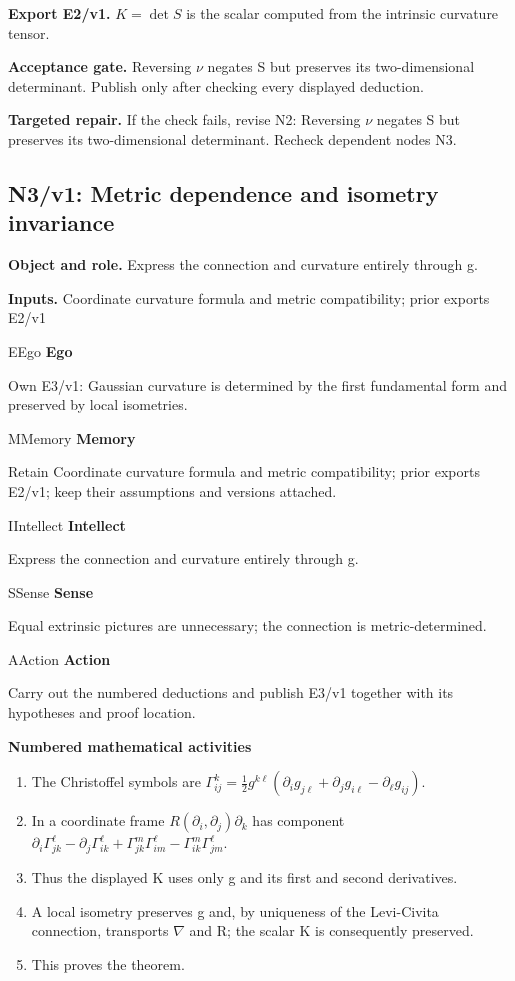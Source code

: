 \documentclass[preprint,12pt,aps,pra,showkeys,amsmath,amssymb,superscriptaddress,floatfix]{revtex4-2}
\theoremstyle{definition}
\theoremstyle{remark}
\newcommand{\mmfaculty}[3]{%
 \begin{mmfacultybox}{#1}{#2}
 {\sffamily\bfseries\color{MMBlue}#2}\par\smallskip #3
 \end{mmfacultybox}}
\newcommand{\field}[2]{\par\smallskip\noindent\textbf{#1.} #2\par}
\begin{document}
\field{Export E2/v1}{\(K=\operatorname{det} S\) is the scalar computed from the intrinsic
curvature tensor.}

\field{Acceptance gate}{Reversing \(\nu\) negates S but preserves its two-dimensional
determinant. Publish only after checking every displayed deduction.}

\field{Targeted repair}{If the check fails, revise N2: Reversing \(\nu\) negates S but preserves
its two-dimensional determinant. Recheck dependent nodes N3.}

\clearpage

\subsection{N3/v1: Metric dependence and isometry invariance}

\field{Object and role}{Express the connection and curvature entirely through g.}

\field{Inputs}{Coordinate curvature formula and metric compatibility; prior exports
E2/v1}

\mmfaculty{E}{Ego}{Own E3/v1: Gaussian curvature is determined by the first fundamental
form and preserved by local isometries.}

\mmfaculty{M}{Memory}{Retain Coordinate curvature formula and metric compatibility; prior
exports E2/v1; keep their assumptions and versions attached.}

\mmfaculty{I}{Intellect}{Express the connection and curvature entirely through g.}

\mmfaculty{S}{Sense}{Equal extrinsic pictures are unnecessary; the connection is
metric-determined.}

\mmfaculty{A}{Action}{Carry out the numbered deductions and publish E3/v1 together with its
hypotheses and proof location.}

\smallskip\noindent\textbf{Numbered mathematical activities}

\begin{enumerate}[label=N3.\arabic*,leftmargin=3.4em]

\item The Christoffel symbols are
\(\Gamma^k_{ij}=\tfrac12 g^{k\ell}(\partial_i g_{j\ell}+\partial_j g_{i\ell}-\partial_\ell g_{ij})\).

\item In a coordinate frame \(R(\partial _i,\partial _j)\partial _k\) has
component
\(\partial_i\Gamma^\ell_{jk}-\partial_j\Gamma^\ell_{ik}+\Gamma^m_{jk}\Gamma^\ell_{im}-\Gamma^m_{ik}\Gamma^\ell_{jm}\).

\item Thus the displayed K uses only g and its first and second derivatives.

\item A local isometry preserves g and, by uniqueness of the Levi-Civita
connection, transports \(\nabla\) and R; the scalar K is consequently
preserved.

\item This proves the theorem.

\end{enumerate}
\end{document}
